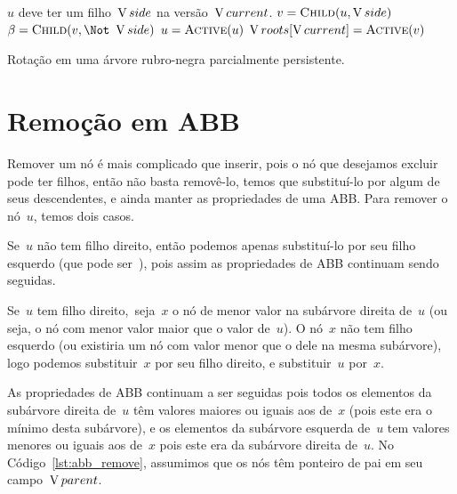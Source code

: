 \documentclass[main.tex]{subfiles}
\begin{document}
\begin{algorithm}
\begin{algorithmic}[1]
\Require $u$ deve ter um filho~$\operatorname{V}{side}$ na versão~$\operatorname{V}{current}$.
	\State $v = \Call{Child}{u, \side}$
	\State $\beta = \Call{Child}{v, \Not\ \side}$
	\State {}
	\State {}
	\State $u = \Call{Active}{u}$ \label{line:rotrb:active}
		\State {}
	\Else
		\State $\roots[\cur] = \Call{Active}{v}$ 
	\EndIf
	\State {}
\EndFunction
\end{algorithmic}
\caption{Rotação em uma árvore rubro-negra parcialmente persistente.} \label{lst:rotrb}
\end{algorithm}

\section{Remoção em ABB}

Remover um nó é mais complicado que inserir, pois o nó que desejamos excluir pode ter filhos, então não basta removê-lo, temos que substituí-lo por algum de seus descendentes, e ainda manter as propriedades de uma ABB. Para remover o nó~$u$, temos dois casos.

Se~$u$ não tem filho direito, então podemos apenas substituí-lo por seu filho esquerdo (que pode ser~), pois assim as propriedades de ABB continuam sendo seguidas.

Se~$u$ tem filho direito,~seja~$x$ o nó de menor valor na subárvore direita de~$u$ (ou seja, o nó com menor valor maior que o valor de~$u$). O nó~$x$ não tem filho esquerdo (ou existiria um nó com valor menor que o dele na mesma subárvore), logo podemos substituir~$x$ por seu filho direito, e substituir~$u$ por~$x$.

As propriedades de ABB continuam a ser seguidas pois todos os elementos da subárvore direita de~$u$ têm valores maiores ou iguais aos de~$x$ (pois este era o mínimo desta subárvore), e os elementos da subárvore esquerda de~$u$ tem valores menores ou iguais aos de~$x$ pois este era da subárvore direita de~$u$. No Código~\ref{lst:abb_remove}, assumimos que os nós têm ponteiro de pai em seu campo~$\operatorname{V}{parent}$.
\end{document}
